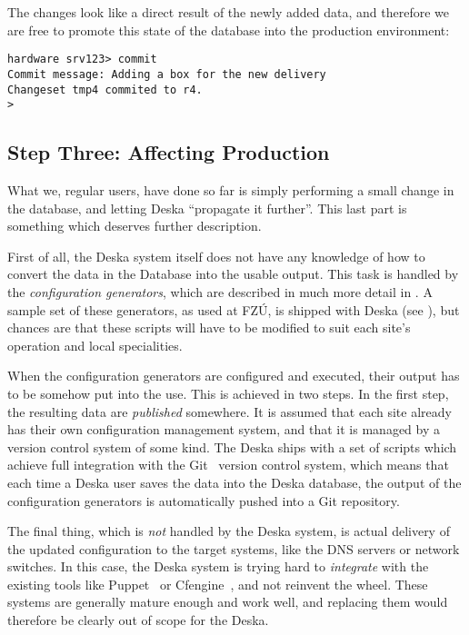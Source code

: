 \documentclass[deska]{subfiles}
\begin{document}
The changes look like a direct result of the newly added data, and therefore we are free to promote this state of the
database into the production environment:

\begin{verbatim}
hardware srv123> commit
Commit message: Adding a box for the new delivery
Changeset tmp4 commited to r4.
>
\end{verbatim}

\subsection{Step Three: Affecting Production}

What we, regular users, have done so far is simply performing a small change in the database, and letting Deska
``propagate it further''.  This last part is something which deserves further description.

First of all, the Deska system itself does not have any knowledge of how to convert the data in the Database into the
usable output.  This task is handled by the {\em configuration generators}, which are described in much more detail in
.  A sample set of these generators, as used at FZÚ, is shipped with Deska (see
), but chances are that these scripts will have to be modified to suit each site's operation and
local specialities.

When the configuration generators are configured and executed, their output has to be somehow put into the use.  This is
achieved in two steps.  In the first step, the resulting data are {\em published} somewhere.  It is assumed that each
site already has their own configuration management system, and that it is managed by a version control system of some
kind.  The Deska ships with a set of scripts which achieve full integration with the Git~\cite{git} version control
system, which means that each time a Deska user saves the data into the Deska database, the output of the configuration
generators is automatically pushed into a Git repository.

The final thing, which is {\em not} handled by the Deska system, is actual delivery of the updated configuration to the
target systems, like the DNS servers or network switches.  In this case, the Deska system is trying hard to {\em
integrate} with the existing tools like Puppet~\cite{puppet} or Cfengine~\cite{cfengine}, and not reinvent the wheel.
These systems are generally mature enough and work well, and replacing them would therefore be clearly out of scope for
the Deska.
\end{document}
